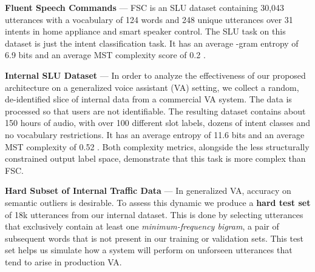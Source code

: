 \noindent \textbf{Fluent Speech Commands} ---
FSC \cite{lugosch2019speech} is an SLU dataset containing 30,043 utterances with a vocabulary of 124 words and 248 unique utterances over 31 intents in home appliance and smart speaker control. The SLU task on this dataset is just the intent classification task. It has an average -gram entropy of 6.9 bits and an average MST complexity score of 0.2 \cite{mckenna2020semantic}. 

\noindent \textbf{Internal SLU Dataset} --- 
In order to analyze the effectiveness of our proposed architecture on a generalized voice assistant (VA) setting, we collect a random, de-identified slice of internal data from a commercial VA system. The data is processed so that users are not identifiable. The resulting dataset contains about 150 hours of audio, with over 100 different slot labels, dozens of intent classes and no vocabulary restrictions.  It has an average entropy of 11.6 bits and an average MST complexity of 0.52 \cite{mckenna2020semantic}. Both complexity metrics, alongside the less structurally constrained output label space, demonstrate that this task is more complex than FSC.

\noindent \textbf{Hard Subset of Internal Traffic Data} ---
In generalized VA, accuracy on semantic outliers is desirable. To assess this dynamic we produce a \textbf{hard test set} of 18k utterances from our internal  dataset. This is done by selecting utterances that exclusively contain at least one \textit{minimum-frequency bigram}, a pair of subsequent words that is not present in our training or validation sets. This test set helps us simulate how a system will perform on unforseen utterances that tend to arise in production VA.

